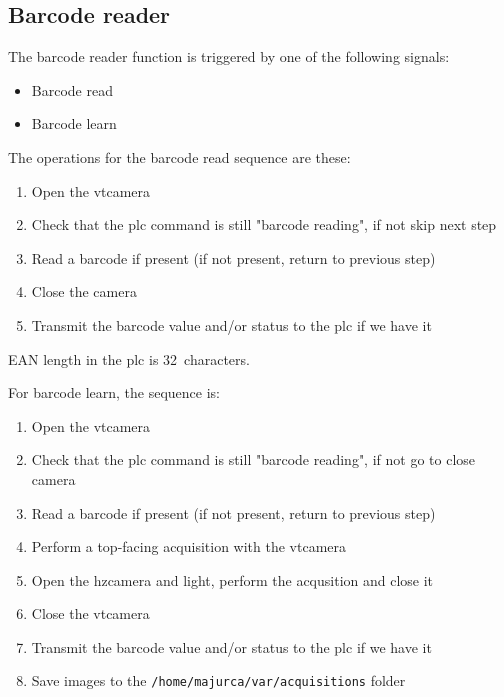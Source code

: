 \subsection{Barcode reader}

The barcode reader function is triggered by one of the following signals:

\begin{itemize}
	\item Barcode read
	\item Barcode learn
\end{itemize}

The operations for the barcode read sequence are these:

\begin{enumerate}
    \item Open the \gls{vtcamera}
    \item Check that the \gls{plc} command is still "barcode reading", if not skip next step
    \item Read a barcode if present (if not present, return to previous step)
    \item Close the camera
    \item Transmit the barcode value and/or status to the \gls{plc} if we have it
\end{enumerate}



EAN length in the \gls{plc} is 32~characters.

For barcode learn, the sequence is:

\begin{enumerate}
    \item Open the \gls{vtcamera}
    \item Check that the \gls{plc} command is still "barcode reading", if not go to close camera
    \item Read a barcode if present (if not present, return to previous step)
	\item Perform a top-facing acquisition with the \gls{vtcamera}
	\item Open the \gls{hzcamera} and light, perform the acqusition and close it
    \item Close the \gls{vtcamera}
    \item Transmit the barcode value and/or status to the \gls{plc} if we have it
	\item Save images to the \texttt{/home/majurca/var/acquisitions} folder
\end{enumerate}


